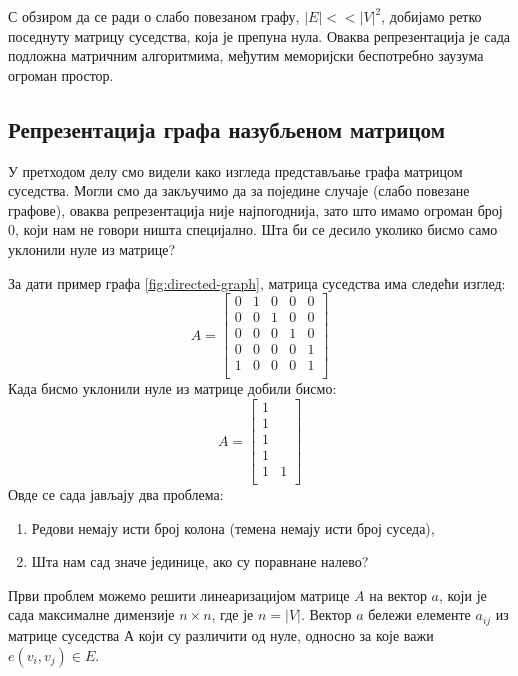 \par
С обзиром да се ради о слабо повезаном графу, $|E| << |V|^2$, добијамо ретко поседнуту матрицу суседства, која је препуна нула. Оваква репрезентација је сада подложна матричним алгоритмима, међутим меморијски беспотребно заузума огроман простор.

\subsection{Репрезентација графа назубљеном матрицом} \label{graph-as-sparse-matrix}
У претходом делу смо видели како изгледа представљање графа матрицом суседства. Могли смо да закључимо да за поједине случаје (слабо повезане графове), оваква репрезентација није најпогоднија, зато што имамо огроман број $0$, који нам не говори ништа специјално. Шта би се десило уколико бисмо само уклонили нуле из матрице?

За дати пример графа \ref{fig:directed-graph}, матрица суседства има следећи изглед:
$$
A =
\begin{bmatrix}
0 & 1 & 0 & 0 & 0 \\
0 & 0 & 1 & 0 & 0 \\
0 & 0 & 0 & 1 & 0 \\
0 & 0 & 0 & 0 & 1 \\
1 & 0 & 0 & 0 & 1 \\
\end{bmatrix}
$$
Када бисмо уклонили нуле из матрице добили бисмо:
$$
A =
\begin{bmatrix}
1 \\
1 \\
1 \\
1 \\
1 & 1 \\
\end{bmatrix}
$$
Овде се сада јављају два проблема:
\begin{enumerate}
    \item Редови немају исти број колона (темена немају исти број суседа),
    \item Шта нам сад значе јединице, ако су поравнане налево?
\end{enumerate}

\par
Први проблем можемо решити линеаризацијом матрице $A$ на вектор $a$, који је сада максималне димензије $n \times n$, где је $n = |V|$. Вектор $a$ бележи елементе $a_{ij}$ из матрице суседства $А$ који су различити од нуле, односно за које важи $e(v_i, v_j) \in E$.

